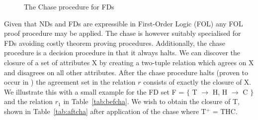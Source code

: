 {\renewcommand{\baselinestretch}{1}
\begin{figure}[ht]
\begin{center}
\end{center}
\caption{\label{rev:fd_chase} The Chase procedure for FDs}
\end{figure}
}

Given that NDs and FDs are expressible in First-Order Logic (FOL) any
FOL proof procedure may be applied. The chase is however suitably
specialised for FDs avoiding costly theorem proving
procedures. Additionally, the 
chase procedure is a decision procedure in that it always halts.
We can discover the closure of a set of attributes
X by creating a two-tuple relation which agrees on X and disagrees
on all other attributes. After the chase procedure halts (proven to
occur in \cite{mms79}) the agreement set in the relation $r$ consists
of exactly the closure of X.  We illustrate this with a small
example for the FD set F = $\{$ T $\to$ H, H $\to$ C $\}$ and the
relation $r_{1}$ in Table~\ref{tab:befcha}. We wish to
obtain the closure of T, shown in Table~\ref{tab:aftcha} after
application of the chase where T$^+$ = THC.


